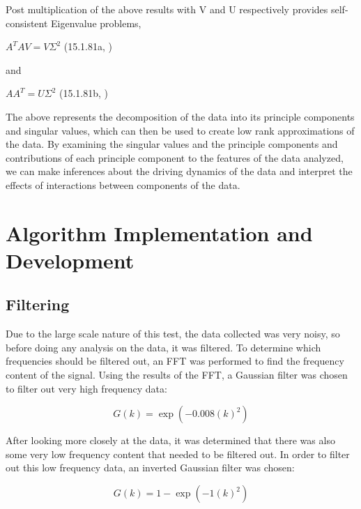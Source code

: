 \documentclass{article}
\begin{document}
Post multiplication of the above results with V and U respectively provides self-consistent Eigenvalue problems, \\
\begin{center}$A^T AV = V\Sigma ^2$  (15.1.81a, \cite{kutz_2013}) \end{center}
and
\begin{center}$AA^T= U\Sigma ^2$  (15.1.81b, \cite{kutz_2013}) \end{center}

The above represents the decomposition of the data into its principle components and singular values, which can then be used to create low rank approximations of the data. By examining the singular values and the principle components and contributions of each principle component to the features of the data analyzed, we can make inferences about the driving dynamics of the data and interpret the effects of interactions between components of the data. 

\FloatBarrier

\section{Algorithm Implementation and Development}

\subsection{Filtering}

Due to the large scale nature of this test, the data collected was very noisy, so before doing any analysis on the data, it was filtered. To determine which frequencies should be filtered out, an FFT was performed to find the frequency content of the signal. Using the results of the FFT, a Gaussian filter was chosen to filter out very high frequency data: 

\begin{equation}
    G(k) = \exp{(-0.008(k)^{2})}
\end{equation}

After looking more closely at the data, it was determined that there was also some very low frequency content that needed to be filtered out. In order to filter out this low frequency data, an inverted Gaussian filter was chosen: 

\begin{equation}
    G(k) = 1-\exp{(-1(k)^{2})}
\end{equation}
\end{document}
